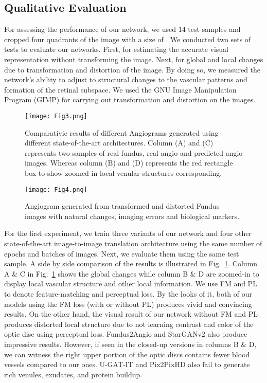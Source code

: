 \documentclass[a4paper,conference]{IEEEtran}
\begin{document}
\subsection{Qualitative Evaluation}
\label{subsec:qual}
For assessing the performance of our network, we used 14 test samples and cropped four quadrants of the image with a size of . We conducted two sets of tests to evaluate our networks. First, for estimating the accurate visual representation without transforming the image. Next, for global and local changes due to transformation and distortion of the image. By doing so, we measured the network's ability to adjust to structural changes to the vascular patterns and formation of the retinal subspace. We used the GNU Image Manipulation Program (GIMP) \cite{gimp2019gimp} for carrying out transformation and distortion on the images.
 
\begin{figure}[ht]
    \centering
    \texttt{[image: Fig3.png]}
    \caption{Comparativie results of different Angiograms generated using different state-of-the-art architectures. Column (A) and (C) represents two samples of real fundus, real angio and predicted angio images. Whereas column (B) and (D) represents the red rectangle box to show zoomed in local venular structures corresponding.}
    \label{fig3}
\end{figure}



\begin{figure}[ht]
    \centering
    \texttt{[image: Fig4.png]}
    \caption{Angiogram generated from transformed and distorted Fundus images with natural changes, imaging errors and biological markers.}
    \label{fig4}
\end{figure} 



For the first experiment, we train three variants of our network and four other state-of-the-art image-to-image translation architecture using the same number of epochs and batches of images. Next, we evaluate them using the same test sample. A side by side comparison of the results is illustrated in Fig.~\ref{fig3}. Column A \& C in Fig.~\ref{fig3} shows the global changes while column B \& D are zoomed-in to display local vascular structure and other local information. We use FM and PL to denote feature-matching and perceptual loss. By the looks of it, both of our models using the FM loss (with or without PL) produces vivid and convincing results. On the other hand, the visual result of our network without FM and PL produces distorted local structure due to not learning contrast and color of the optic disc using perceptual loss. Fundus2Angio and StarGANv2 also produce impressive results. However, if seen in the closed-up versions in columns B \& D, we can witness the right upper portion of the optic discs contains fewer blood vessels compared to our ones. U-GAT-IT and Pix2PixHD also fail to generate rich venules,  exudates, and protein buildup. 
\end{document}
